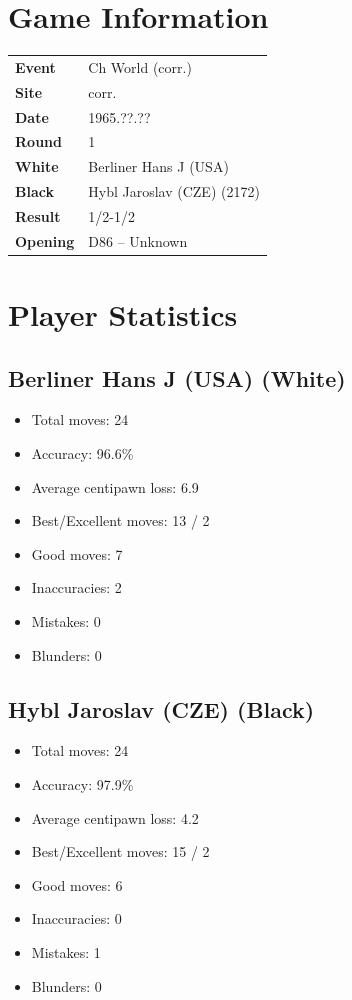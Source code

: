 \documentclass[11pt]{book}
\begin{document}
\section{Game Information}
\begin{tabular}{ll}
\textbf{Event} & Ch World (corr.) \\
\textbf{Site} & corr. \\
\textbf{Date} & 1965.??.?? \\
\textbf{Round} & 1 \\
\textbf{White} & Berliner Hans J (USA) \\
\textbf{Black} & Hybl Jaroslav (CZE) (2172) \\
\textbf{Result} & 1/2-1/2 \\
\textbf{Opening} & D86 -- Unknown \\
\end{tabular}

\section{Player Statistics}

\subsection{Berliner Hans J (USA) (White)}
\begin{itemize}
\item Total moves: 24
\item Accuracy: 96.6\%
\item Average centipawn loss: 6.9
\item Best/Excellent moves: 13 / 2
\item Good moves: 7
\item Inaccuracies: 2
\item Mistakes: 0
\item Blunders: 0
\end{itemize}

\subsection{Hybl Jaroslav (CZE) (Black)}
\begin{itemize}
\item Total moves: 24
\item Accuracy: 97.9\%
\item Average centipawn loss: 4.2
\item Best/Excellent moves: 15 / 2
\item Good moves: 6
\item Inaccuracies: 0
\item Mistakes: 1
\item Blunders: 0
\end{itemize}
\end{document}
